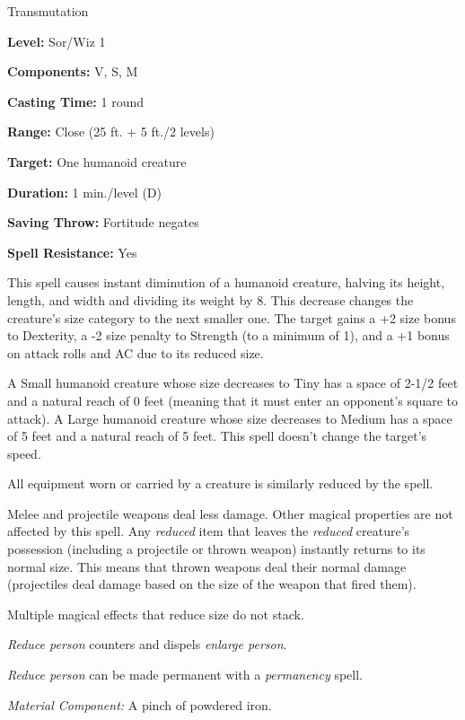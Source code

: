
Transmutation

\textbf{Level:} Sor/Wiz 1

\textbf{Components:} V, S, M

\textbf{Casting Time:} 1 round

\textbf{Range:} Close (25 ft. + 5 ft./2 levels)

\textbf{Target:} One humanoid creature

\textbf{Duration:} 1 min./level (D)

\textbf{Saving Throw:} Fortitude negates

\textbf{Spell Resistance:} Yes

This spell causes instant diminution of a humanoid creature, halving its height, 
length, and width and dividing its weight by 8. This decrease changes the creature's 
size category to the next smaller one. The target gains a +2 size bonus to Dexterity, 
a -2 size penalty to Strength (to a minimum of 1), and a +1 bonus on attack rolls 
and AC due to its reduced size.

A Small humanoid creature whose size decreases to Tiny has a space of 2-1/2 feet 
and a natural reach of 0 feet (meaning that it must enter an opponent's square 
to attack). A Large humanoid creature whose size decreases to Medium has a space 
of 5 feet and a natural reach of 5 feet. This spell doesn't change the target's 
speed.

All equipment worn or carried by a creature is similarly reduced by the spell.

Melee and projectile weapons deal less damage. Other magical properties are not 
affected by this spell. Any \textit{reduced} item that leaves the \textit{reduced 
}creature's possession (including a projectile or thrown weapon) instantly returns 
to its normal size. This means that thrown weapons deal their normal damage (projectiles 
deal damage based on the size of the weapon that fired them).

Multiple magical effects that reduce size do not stack.

\textit{Reduce person} counters and dispels \textit{enlarge person}.

\textit{Reduce person} can be made permanent with a \textit{permanency} spell.

\textit{Material Component:} A pinch of powdered iron.

